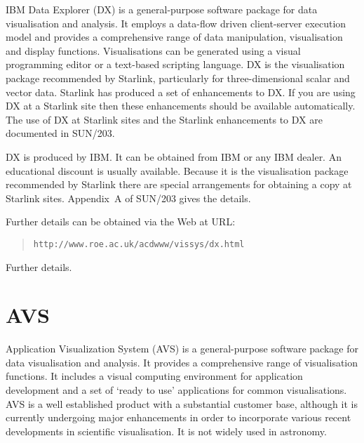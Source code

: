 \documentclass[twoside,11pt]{article}
\newcommand{\htmladdnormallink}[2]{#1}
\newenvironment{latexonly}{}{}
\newcommand{\xref}[3]{#1}
\newcommand{\xlabel}[1]{}
\begin{document}
IBM Data Explorer (DX) is a general-purpose software package for data
visualisation and analysis. It employs a data-flow driven client-server
execution model and provides a comprehensive range of data manipulation,
visualisation and display functions. Visualisations can be generated
using a visual programming editor or a text-based scripting language.
DX is the visualisation package recommended by Starlink, particularly
for three-dimensional scalar and vector data. Starlink has produced a
set of enhancements to DX. If you are using DX at a Starlink site then
these enhancements should be available automatically. The use of DX at
Starlink sites and the Starlink enhancements to DX are documented in
\xref{SUN/203}{sun203}{}\cite{SUN203}.

DX is produced by IBM. It can be obtained from IBM or any IBM dealer.
An educational discount is usually available. Because it is the
visualisation package recommended by Starlink there are special
arrangements for obtaining a copy at Starlink sites. Appendix~A of
\xref{SUN/203}{sun203}{}\cite{SUN203} gives the details.

\begin{latexonly}
Further details can be obtained via the Web at URL:

\begin{quote}
{\tt http://www.roe.ac.uk/acdwww/vissys/dx.html}
\end{quote}
\end{latexonly}

\begin{htmlonly}
\htmladdnormallink{Further details}
{http://www.roe.ac.uk/acdwww/vissys/dx.html}.
\end{htmlonly}


\section{AVS \label{AVS} \xlabel{AVS} }

Application Visualization System (AVS) is a general-purpose software
package for data visualisation and analysis. It provides a comprehensive
range of visualisation functions. It includes a visual computing
environment for application development and a set of `ready to use'
applications for common visualisations. AVS is a well established
product with a substantial customer base, although it is currently
undergoing major enhancements in order to incorporate various recent
developments in scientific visualisation. It is not widely used in
astronomy.
\end{document}
